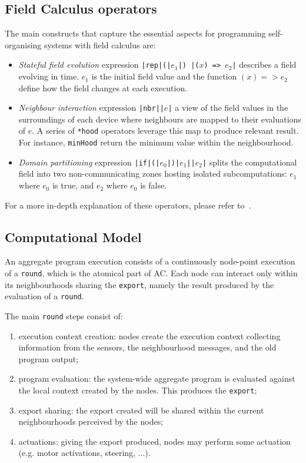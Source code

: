 \documentclass[conference]{IEEEtran}
\newcommand{\round}{\texttt{round}}
\newcommand{\export}{\texttt{export}}
\begin{document}
\subsection{Field Calculus operators}
The main constructs that capture the essential aspects for programming self-organising systems with field calculus are:
\begin{itemize}
  \item \textit{Stateful field evolution} expression \texttt{|{\color{teal}rep}|(|$e_1$|) {|($x$) => $e_2$|}} describes a field evolving in time. 
  $e_1$ is the initial field value and the function $(x) => e_2$ define how the field changes at each execution.
  \item \textit{Neighbour interaction} expression \texttt{|\color{teal}nbr|{|$e$|}} a view
  of the field values in the surroundings of each device where neighbours are
  mapped to their evaluations of $e$. A series of \texttt{*hood} operators leverage this map to produce relevant result. 
  For instance, \texttt{minHood} return the minimum value 
  within the neighbourhood.
  \item \textit{Domain partitioning} expression \texttt{|\color{teal}if|(|$e_0$|){|$e_1$|}{|$e_2$|}} splits the computational
  field into two non-communicating zones hosting isolated subcomputations:
  $e_1$ where $e_0$ is true, and $e_2$ where $e_0$ is false.
\end{itemize}
For a more in-depth explanation of these operators, please refer to~\cite{DBLP:journals/computer/BealPV15}.

\subsection{Computational Model}
An aggregate program execution consists of a continuously node-point execution of a \round{}, 
 which is the atomical part of AC. Each node can interact only within its neighbourhoods sharing the \export{}, namely the result produced by the evaluation of a \round{}.

The main \round{} steps consist of:
\begin{enumerate}
  \item execution context creation: nodes create the execution context collecting information from the sensors, 
  the neighbourhood messages, and the old program output;
  \item program evaluation: the system-wide aggregate program is evaluated against the local context created by the nodes. 
  This produces the \export{};
  \item export sharing: the export created will be shared within the current neighbourhoods perceived by the nodes;
  \item actuations: giving the export produced, nodes may perform some actuation (e.g. motor activations, steering, ...).
\end{enumerate}
\end{document}
